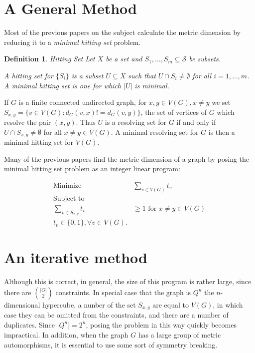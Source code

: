 \documentclass{article}
\newcommand{\cS}{\mathcal{S}}
\newtheorem{definition}{Definition}
\begin{document}
\section{A General Method}
\label{sec:general}

Most of the previous papers on the subject calculate the metric
dimension by reducing it to a \emph{minimal hitting set} problem.
\begin{definition}{Hitting Set}
Let $X$ be a set and $S_1 , \dots, S_m \subseteq \cS$ be subsets.

A \emph{hitting set} for $\{S_i\}$ is a subset $U \subseteq X$ such
that $U \cap S_i \ne \emptyset$ for all $i=1, \dots, m$.
A \emph{minimal hitting set} is one for which $|U|$ is minimal.
\end{definition}
If $G$ is a finite connected undirected graph, for $x,y \in V(G), x
\ne y$
we set $S_{x,y} = \{v \in V(G): d_G(v,x) != d_G(v,y)\}$, the set of
vertices of $G$ which resolve the pair $(x,y)$.  Thus $U$ is a
resolving set for $G$ if and only if $U \cap S_{x,y} \ne \emptyset$
for all $x \ne y \in V(G)$.
A minimal resolving set for $G$ is then a minimal hitting set
for $V(G)$.

Many of the previous papers find the metric dimension of a graph by
posing the minimal hitting set problem as an integer linear program:

\begin{equation}
  \label{eq:ilp}
  \begin{aligned}
    \text{Minimize } & \sum_{v \in V(G)} t_v \\
    \text{Subject to} \\
    \sum_{v \in S_{x,y}} t_v & \ge 1 \text{ for } x \ne y \in V(G) \\
    t_v \in \{0,1\}, \forall v \in V(G).
  \end{aligned}
\end{equation}

\section{An iterative method}
\label{sec:iterative}

Although this is correct, in general, the size of this program is
rather large, since there are $\binom{|G|}{2}$ constraints.  In
special case that the graph is $Q^n$ the $n$-dimensional hypercube, a
nunber of the set $S_{x,y}$ are equal to $V(G)$, in which case they
can be omitted from the constraints, and there are a number of
duplicates.  Since $|Q^n| = 2^n$, posing the problem in this way
quickly becomes impractical.  In addition, when the graph $G$ has a
large group of metric automorphisms, it is essential to use some sort
of symmetry breaking.
\end{document}
